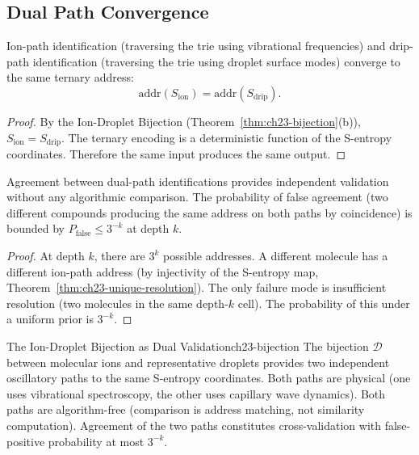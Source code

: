 \subsection{Dual Path Convergence}
\label{sec:ch23-convergence}

\begin{theorem}
\label{thm:ch23-dual-convergence}
Ion-path identification (traversing the trie using vibrational frequencies)
and drip-path identification (traversing the trie using droplet surface modes)
converge to the same ternary address:
\[
  \mathrm{addr}(S_{\mathrm{ion}}) = \mathrm{addr}(S_{\mathrm{drip}}).
\]
\end{theorem}

\begin{proof}
By the Ion-Droplet Bijection (Theorem~\ref{thm:ch23-bijection}(b)),
$S_{\mathrm{ion}} = S_{\mathrm{drip}}$.  The ternary encoding is a
deterministic function of the S-entropy coordinates.  Therefore the same
input produces the same output.
\end{proof}

\begin{corollary}
\label{cor:ch23-validation}
Agreement between dual-path identifications provides independent validation
without any algorithmic comparison.  The probability of false agreement
(two different compounds producing the same address on both paths by
coincidence) is bounded by $P_{\mathrm{false}} \leq 3^{-k}$ at depth $k$.
\end{corollary}

\begin{proof}
At depth $k$, there are $3^k$ possible addresses.  A different molecule
has a different ion-path address (by injectivity of the S-entropy map,
Theorem~\ref{thm:ch23-unique-resolution}).  The only failure mode is
insufficient resolution (two molecules in the same depth-$k$ cell).  The
probability of this under a uniform prior is $3^{-k}$.
\end{proof}

\begin{consequence}{The Ion-Droplet Bijection as Dual Validation}{ch23-bijection}
The bijection $\mathcal{D}$ between molecular ions and representative droplets
provides two independent oscillatory paths to the same S-entropy coordinates.
Both paths are physical (one uses vibrational spectroscopy, the other uses
capillary wave dynamics).  Both paths are algorithm-free (comparison is
address matching, not similarity computation).  Agreement of the two paths
constitutes cross-validation with false-positive probability at most $3^{-k}$.
\end{consequence}

